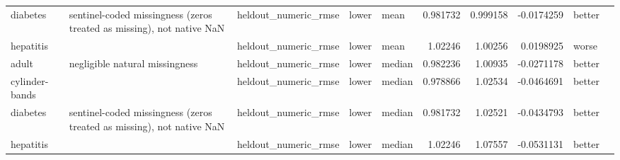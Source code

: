 \begin{table}[ht]
{\begin{tabular}{lllllrrrll}
 diabetes       & sentinel-coded missingness (zeros treated as missing), not native NaN & heldout\_numeric\_rmse           & lower              & mean             &                   0.981732 &               0.999158 &                    -0.0174259   & better               &                                                                                                                    \\
 hepatitis      &                                                                       & heldout\_numeric\_rmse           & lower              & mean             &                   1.02246  &               1.00256  &                     0.0198925   & worse                &                                                                                                                    \\
 adult          & negligible natural missingness                                        & heldout\_numeric\_rmse           & lower              & median           &                   0.982236 &               1.00935  &                    -0.0271178   & better               &                                                                                                                    \\
 cylinder-bands &                                                                       & heldout\_numeric\_rmse           & lower              & median           &                   0.978866 &               1.02534  &                    -0.0464691   & better               &                                                                                                                    \\
 diabetes       & sentinel-coded missingness (zeros treated as missing), not native NaN & heldout\_numeric\_rmse           & lower              & median           &                   0.981732 &               1.02521  &                    -0.0434793   & better               &                                                                                                                    \\
 hepatitis      &                                                                       & heldout\_numeric\_rmse           & lower              & median           &                   1.02246  &               1.07557  &                    -0.0531131   & better               &                                                                                                                    \\

\end{tabular}}
\end{table}
